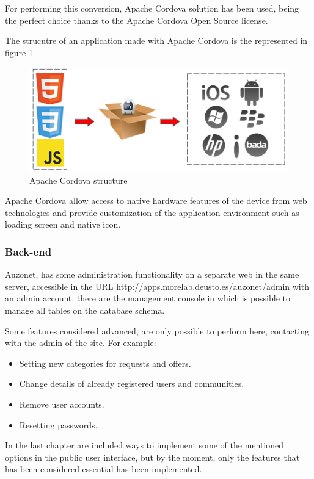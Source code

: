\documentclass{DeustoFDP}
\begin{document}
For performing this conversion, Apache Cordova solution has been used, being the perfect choice thanks to the Apache Cordova Open Source license.

The strucutre of an application made with Apache Cordova is the represented in figure \ref{fig:cordova_workflow}

\begin{figure}[h]
\centering
\includegraphics[width=0.7\linewidth]{fig/cordova_workflow}
\caption[Apache Cordova structure]{Apache Cordova structure}
\label{fig:cordova_workflow}
\end{figure}

Apache Cordova allow access to native hardware features of the device from web technologies and provide customization of the application environment such as loading screen and native icon.
\newpage
\subsubsection{Back-end}
Auzonet, has some administration functionality on a separate web in the same server, accessible in the URL http://apps.morelab.deusto.es/auzonet/admin with an admin account, there are the management console in which is possible to manage all tables on the database schema.

Some features considered advanced, are only possible to perform here, contacting with the admin of the site. For example:

\begin{itemize}
	\item Setting new categories for requests and offers.
	\item Change details of already registered users and communities.
	\item Remove user accounts.
	\item Resetting passwords.
\end{itemize}

In the last chapter are included ways to implement some of the mentioned options in the public user interface, but by the moment, only the features that has been considered essential has been implemented.
\newpage
\end{document}
